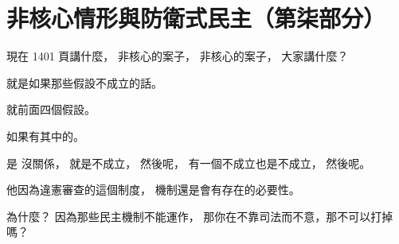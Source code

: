 \section{非核心情形與防衛式民主（第柒部分）}

\hypertarget{w06:cue:3183}{}現在 1401 頁講什麼，
\hypertarget{w06:cue:3184}{}非核心的案子，
\hypertarget{w06:cue:3185}{}非核心的案子，
\hypertarget{w06:cue:3186}{}大家講什麼？

\hypertarget{w06:cue:3187}{}就是如果那些假設不成立的話。

\hypertarget{w06:cue:3188}{}就前面四個假設。

\hypertarget{w06:cue:3189}{}如果有其中的。

\hypertarget{w06:cue:3190}{}是 沒關係，
\hypertarget{w06:cue:3191}{}就是不成立，
\hypertarget{w06:cue:3192}{}然後呢，
\hypertarget{w06:cue:3193}{}有一個不成立也是不成立，
\hypertarget{w06:cue:3194}{}然後呢。

\hypertarget{w06:cue:3195}{}他因為違憲審查的這個制度，
\hypertarget{w06:cue:3196}{}機制還是會有存在的必要性。

\hypertarget{w06:cue:3197}{}為什麼？
\hypertarget{w06:cue:3198}{}因為那些民主機制不能運作，
\hypertarget{w06:cue:3199}{}那你在不靠司法而不意，那不可以打掉嗎？

